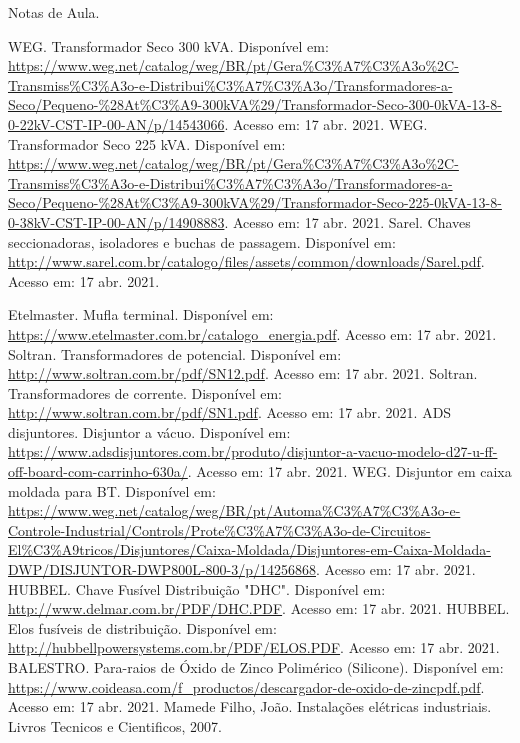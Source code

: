 



\pagebreak

\begin{thebibliography}
\raggedright
{} Notas de Aula.

 WEG. Transformador Seco 300 kVA. Disponível em:  \url{https://www.weg.net/catalog/weg/BR/pt/Gera\%C3\%A7\%C3\%A3o\%2C-Transmiss\%C3\%A3o-e-Distribui\%C3\%A7\%C3\%A3o/Transformadores-a-Seco/Pequeno-\%28At\%C3\%A9-300kVA\%29/Transformador-Seco-300-0kVA-13-8-0-22kV-CST-IP-00-AN/p/14543066}. Acesso em: 17 abr. 2021.
 WEG. Transformador Seco 225 kVA. Disponível em:  \url{https://www.weg.net/catalog/weg/BR/pt/Gera\%C3\%A7\%C3\%A3o\%2C-Transmiss\%C3\%A3o-e-Distribui\%C3\%A7\%C3\%A3o/Transformadores-a-Seco/Pequeno-\%28At\%C3\%A9-300kVA\%29/Transformador-Seco-225-0kVA-13-8-0-38kV-CST-IP-00-AN/p/14908883}. Acesso em: 17 abr. 2021.
 Sarel. Chaves seccionadoras, isoladores e buchas de passagem. Disponível em:  \url{http://www.sarel.com.br/catalogo/files/assets/common/downloads/Sarel.pdf}. Acesso em: 17 abr. 2021.

 Etelmaster. Mufla terminal. Disponível em:  \url{https://www.etelmaster.com.br/catalogo_energia.pdf}. Acesso em: 17 abr. 2021.
 Soltran. Transformadores de potencial. Disponível em:  \url{http://www.soltran.com.br/pdf/SN12.pdf}. Acesso em: 17 abr. 2021.
 Soltran. Transformadores de corrente. Disponível em:  \url{http://www.soltran.com.br/pdf/SN1.pdf}. Acesso em: 17 abr. 2021.
 ADS disjuntores. Disjuntor a vácuo. Disponível em:  \url{https://www.adsdisjuntores.com.br/produto/disjuntor-a-vacuo-modelo-d27-u-ff-off-board-com-carrinho-630a/}. Acesso em: 17 abr. 2021.
 WEG. Disjuntor em caixa moldada para BT. Disponível em:  \url{https://www.weg.net/catalog/weg/BR/pt/Automa\%C3\%A7\%C3\%A3o-e-Controle-Industrial/Controls/Prote\%C3\%A7\%C3\%A3o-de-Circuitos-El\%C3\%A9tricos/Disjuntores/Caixa-Moldada/Disjuntores-em-Caixa-Moldada-DWP/DISJUNTOR-DWP800L-800-3/p/14256868}. Acesso em: 17 abr. 2021.
 HUBBEL. Chave Fusível Distribuição "DHC". Disponível em: \url{http://www.delmar.com.br/PDF/DHC.PDF}. Acesso em: 17 abr. 2021.
 HUBBEL. Elos fusíveis de distribuição. Disponível em: \url{http://hubbellpowersystems.com.br/PDF/ELOS.PDF}. Acesso em: 17 abr. 2021.
 BALESTRO. Para-raios de Óxido de Zinco Polimérico (Silicone). Disponível em: \url{https://www.coideasa.com/f_productos/descargador-de-oxido-de-zincpdf.pdf}. Acesso em: 17 abr. 2021.
 Mamede Filho, João. Instalações elétricas industriais. Livros Tecnicos e Cientificos, 2007.
\end{thebibliography}



